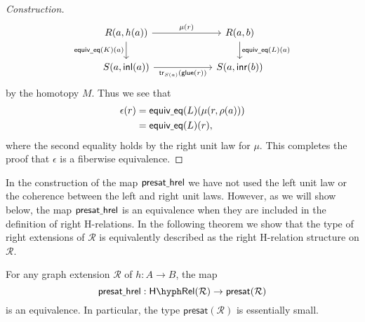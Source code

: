 \begin{proof}[Construction]
\begin{equation*}
\begin{tikzcd}[column sep=6em]
R(a,h(a)) \arrow[r,"\mu(r)"] \arrow[d,swap,"\mathsf{equiv\usc{}eq}(K)(a)"] & R(a,b) \arrow[d,"\mathsf{equiv\usc{}eq}(L)(a)"] \\
S(a,\inl(a)) \arrow[r,swap,"\mathsf{tr}_{S(a)}(\glue(r))"] & S(a,\inr(b))
\end{tikzcd}
\end{equation*}
by the homotopy $M$. Thus we see that
\begin{align*}
\epsilon(r) & = \mathsf{equiv\underline{\ }{}eq}(L)(\mu(r,\rho(a))) \\
& = \mathsf{equiv\underline{\ }{}eq}(L)(r),
\end{align*}
where the second equality holds by the right unit law for $\mu$. This completes the proof that $\epsilon$ is a fiberwise equivalence.
\end{proof}

In the construction of the map $\mathsf{presat\underline{\ }{}hrel}$ we have not used the left unit law or the coherence between the left and right unit laws. However, as we will show below, the map $\mathsf{presat\underline{\ }{}hrel}$ is an equivalence when they are included in the definition of right H-relations. In the following theorem we show that the type of right extensions of $\mathcal{R}$ is equivalently described as the right H-relation structure on $\mathcal{R}$.

\begin{thm}\label{thm:hrel}
For any graph extension $\mathcal{R}$ of $h:A\to B$, the map
\begin{equation*}
\mathsf{presat\usc{}hrel}:\mathsf{H\hyph Rel}(\mathcal{R})\to \mathsf{presat}(\mathcal{R})
\end{equation*}
is an equivalence. In particular, the type $\mathsf{presat}(\mathcal{R})$ is essentially small.
\end{thm}

